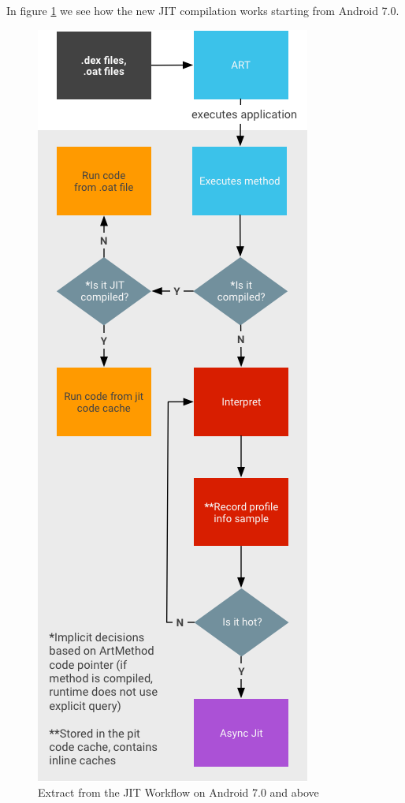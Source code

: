In figure \ref{JitWorkflow} we see how the new JIT compilation works starting from Android 7.0.     
    
\begin{figure}[H]
	\begin{center}
		\includegraphics[scale=0.45]{figures/jit-workflow-extract.png}
	\end{center}
	\caption{Extract from the JIT Workflow on Android 7.0 and above \cite{JitWorkFlow}}
	\label{JitWorkflow}
\end{figure}

